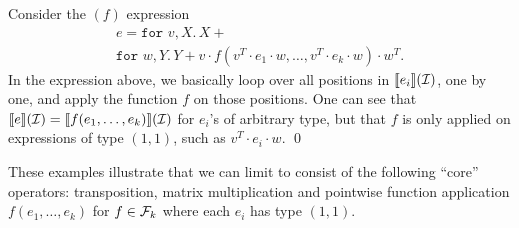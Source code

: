 \begin{example}Consider the \langfor$(f)$ expression 
\begin{multline*}
e=\texttt{for }v,X.\, X + \\ 
\texttt{for }w,Y.\, Y + v\cdot f(v^T\cdot e_1\cdot w, \ldots, v^T\cdot e_k\cdot w)\cdot w^T. 
\end{multline*}
In the expression above, we basically loop over all positions in $\llbracket e_i \rrbracket(\mathcal{I})$, one by one, and apply the function $f$ on those positions.  One can see that $\llbracket e \rrbracket(\mathcal{I})=\llbracket f(e_1,\ldots,e_k) \rrbracket(\mathcal{I})$ for $e_i$'s of arbitrary type, but that $f$ is only
applied on expressions of type $(1,1)$, such as $v^T\cdot e_i\cdot w$. \qed
\end{example}
%
%
%
%
%

These examples illustrate that we can limit \langfor to consist of the following ``core'' operators: transposition, matrix multiplication and pointwise function application $f(e_1,\ldots,e_k)$ for $f\in\mathcal{F}_k$ where each $e_i$
has type $(1,1)$. 

